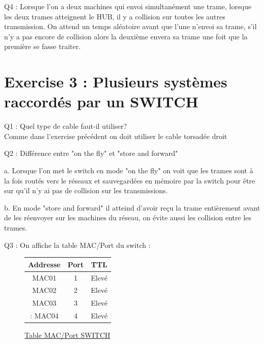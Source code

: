 \documentclass[11pt]{book}
\newcommand{\ul}{\underline}
\begin{document}
        \begin{dent}{Q4 :}
            Lorsque l'on a deux machines qui envoi simultanément une trame, lorsque les deux trames atteignent le HUB, il y a collision sur toutes les autres transmission. On attend un temps aléatoire avant que l'une n'envoi sa trame, s'il n'y a pas encore de collision alors la deuxième envera sa trame une foit que la première se fasse traiter. 
         \end{dent} 
        
    \section{Exercise 3 : Plusieurs systèmes raccordés par un SWITCH}
        
        \begin{dent}{Q1 :} Quel type de cable faut-il utiliser?\\
            Comme dans l'exercise précédent on doit utiliser le cable torsadée droit
         \end{dent}

        \begin{dent}{Q2 :} Différence entre "on the fly" et "store and forward"\\
            \begin{enum}{-15pt}{-15pt}
                \item[a.] Lorsque l'on met le switch en mode "on the fly" on voit que les trames sont à la fois routés vers le réseaux et sauvegardées en mémoire par la switch pour être sur qu'il n'y ai pas de collision sur les transmissions.  
                \item[b.] En mode "store and forward" il atteind d'avoir reçu la trame entièrement avant de les réenvoyer sur les machines du réseau, on évite aussi les collision entre les trames. 
            \end{enum}
         \end{dent}

        \begin{dent}{Q3 :} On affiche la table MAC/Port du switch :
            \begin{figure}[ht]
                \centering
                \begin{tabular}{c|c|c}
                    Addresse & Port & TTL\\
                    \hline
                    MAC01 & 1 & Elevé \\
                    \hline
                    MAC02 & 2 & Elevé \\
                    \hline
                    MAC03 & 3 & Elevé \\
                    \hline:
                    MAC04 & 4 & Elevé \\
                \end{tabular}
                \caption{\ul{Table MAC/Port SWITCH}}
            \end{figure}
         \end{dent}
        
\end{document}
